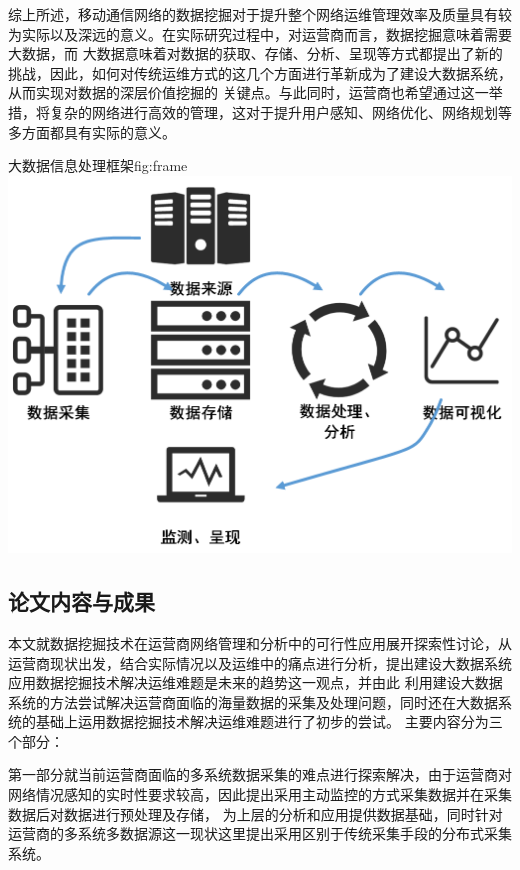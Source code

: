 \documentclass{HustGraduPaper}
\begin{document}
    综上所述，移动通信网络的数据挖掘对于提升整个网络运维管理效率及质量具有较为实际以及深远的意义。在实际研究过程中，对运营商而言，数据挖掘意味着需要大数据，而
    大数据意味着对数据的获取、存储、分析、呈现等方式都提出了新的挑战，因此，如何对传统运维方式的这几个方面进行革新成为了建设大数据系统，从而实现对数据的深层价值挖掘的
    关键点。与此同时，运营商也希望通过这一举措，将复杂的网络进行高效的管理，这对于提升用户感知、网络优化、网络规划等多方面都具有实际的意义。\\
    \begin{generalfig}[htb]{大数据信息处理框架}{fig:frame}
		\includegraphics[width=\textwidth,scale = 0.5]{Figures/frame.png}
	\end{generalfig}

    \subsection{论文内容与成果}

    本文就数据挖掘技术在运营商网络管理和分析中的可行性应用展开探索性讨论，从运营商现状出发，结合实际情况以及运维中的痛点进行分析，提出建设大数据系统应用数据挖掘技术解决运维难题是未来的趋势这一观点，并由此
    利用建设大数据系统的方法尝试解决运营商面临的海量数据的采集及处理问题，同时还在大数据系统的基础上运用数据挖掘技术解决运维难题进行了初步的尝试。
    主要内容分为三个部分：

    第一部分就当前运营商面临的多系统数据采集的难点进行探索解决，由于运营商对网络情况感知的实时性要求较高，因此提出采用主动监控的方式采集数据并在采集数据后对数据进行预处理及存储，
    为上层的分析和应用提供数据基础，同时针对运营商的多系统多数据源这一现状这里提出采用区别于传统采集手段的分布式采集系统。
\end{document}
